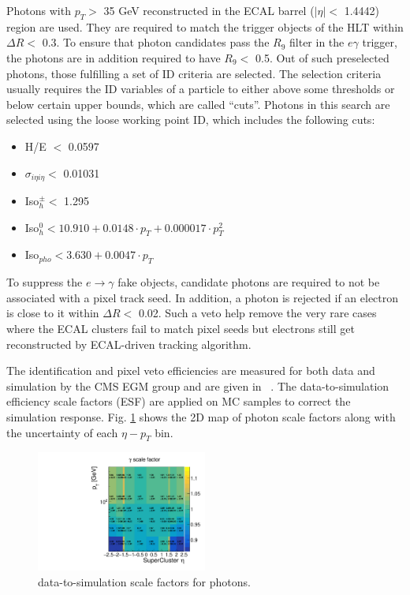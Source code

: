 \documentclass[thesis.tex]{subfiles}
\renewcommand\_{\textunderscore\allowbreak}
\begin{document}
Photons with $p_{T} >$ 35 GeV reconstructed in the ECAL barrel ($|\eta| <$ 1.4442) region are used. 
They are required to match the trigger objects of the HLT within $\Delta R <$ 0.3. 
To ensure that photon candidates pass the $R_9$ filter in the $e\gamma$ trigger, the photons are in addition required to have $R_9 <$ 0.5.
Out of such preselected photons, those fulfilling a set of ID criteria are selected.
The selection criteria usually requires the ID variables of a particle to either above some thresholds or below certain upper bounds, which are called ``cuts''. 
Photons in this search are selected using the loose working point ID, which includes the following cuts: 
\begin{center}
\begin{itemize}
\item H/E $<$ 0.0597
\item $\sigma_{i\eta i\eta} <$ 0.01031 
\item Iso$_h^\pm <$ 1.295
\item Iso$_h^0 < 10.910 +0.0148 \cdot p_{T} + 0.000017 \cdot p^2_{T}$
\item Iso$_{pho} < 3.630+0.0047 \cdot p_{T}$
\end{itemize}
\end{center}

To suppress the $e\rightarrow\gamma$ fake objects, candidate photons are required to not be associated with a pixel track seed. 
In addition, a photon is rejected if an electron is close to it within $\Delta R <$ 0.02. 
Such a veto help remove the very rare cases where the ECAL clusters fail to match pixel seeds but electrons still get reconstructed by ECAL-driven tracking algorithm.

The identification and pixel veto efficiencies are measured for both data and simulation by the CMS EGM group and are given in ~\cite{EGM:leptonScale}. The data-to-simulation efficiency scale factors (ESF) are applied on MC samples to correct the simulation response. Fig. \ref{fig:photonsf} shows the 2D map of photon scale factors along with the uncertainty of each $\eta-p_T$ bin.

\begin{figure}[hbtp]
	\centering
	\includegraphics[width=0.5\textwidth]{plot/SF_Photon.pdf}
	\caption{data-to-simulation scale factors for photons.}
	\label{fig:photonsf}
\end{figure}
\end{document}
